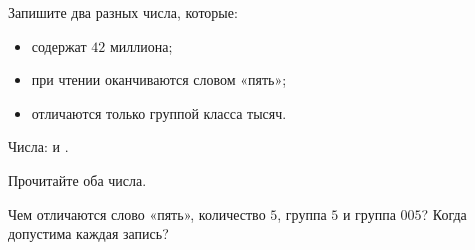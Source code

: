 \begin{practicebox}
  Запишите два разных числа, которые:
  \begin{itemize}
    \item содержат \(42\) миллиона;
    \item при чтении оканчиваются словом «пять»;
    \item отличаются только группой класса тысяч.
  \end{itemize}
  Числа: \answerblank[45mm] и \answerblank[45mm].

  Прочитайте оба числа.
\end{practicebox}

\begin{checkpointbox}[5. Обобщите]
  Чем отличаются слово «пять», количество \(5\), группа \(5\) и группа
  \(005\)? Когда допустима каждая запись?
\end{checkpointbox}

